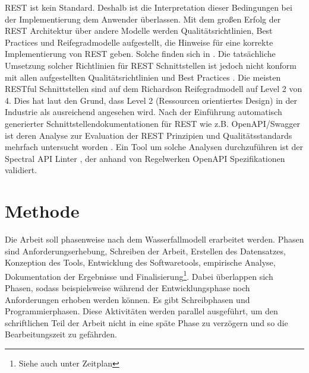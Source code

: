 REST ist kein Standard. Deshalb ist die Interpretation dieser Bedingungen bei der Implementierung dem Anwender überlassen. Mit dem großen Erfolg der REST Architektur über andere Modelle werden  Qualitätsrichtlinien, Best Practices und Reifegradmodelle aufgestellt, die Hinweise für eine korrekte Implementierung von REST geben. Solche finden sich in \parencite{pautasso_restful_2014}\parencite{petrillo_are_2016}\parencite{palma_detection_2014}\parencite{palma_semantic_2017}\parencite{richardson_restful_2007}\parencite{masse_rest_2011}\parencite{webber_rest_2010}\parencite{renzel_todays_2012}\parencite{rodriguez_rest_2016}\parencite{kotstein_which_2021}. 
Die tatsächliche Umsetzung solcher Richtlinien für REST Schnittstellen ist jedoch nicht konform mit allen aufgestellten Qualitätsrichtlinien und Best Practices 
\parencite{renzel_todays_2012}\parencite{palma_detection_2014}\parencite{rodriguez_rest_2016}\parencite{petrillo_are_2016}\parencite{palma_semantic_2017}\parencite{neumann_analysis_2021}. 
Die meisten RESTful Schnittstellen sind auf dem Richardson Reifegradmodell auf Level 2 von 4. Dies hat laut \parencite{kotstein_which_2021} den Grund, dass Level 2 (Ressourcen orientiertes Design) in der Industrie als ausreichend angesehen wird. Nach der Einführung automatisch  generierter Schnittstellendokumentationen für REST wie z.B. OpenAPI/Swagger ist deren Analyse zur Evaluation der REST Prinzipien und Qualitätsstandards mehrfach untersucht worden 
\parencite{haupt_framework_2017}\parencite{bogner_collecting_2020}\parencite{eriksson_using_2023}. 
Ein Tool um solche Analysen durchzuführen ist der Spectral API Linter \parencite{eriksson_using_2023}, der anhand von Regelwerken OpenAPI Spezifikationen validiert.


\section{Methode}
Die Arbeit soll phasenweise nach dem Wasserfallmodell erarbeitet werden. Phasen sind Anforderungserhebung, Schreiben der Arbeit, Erstellen des Datensatzes, Konzeption des Tools, Entwicklung des Softwaretools, empirische Analyse, Dokumentation der Ergebnisse und Finalisierung\footnote{Siehe auch unter Zeitplan}. Dabei überlappen sich Phasen, sodass beispielsweise während der Entwicklungsphase noch Anforderungen erhoben werden können. Es gibt Schreibphasen und Programmierphasen. Diese Aktivitäten werden parallel ausgeführt, um den schriftlichen Teil der Arbeit nicht in eine späte Phase zu verzögern und so die Bearbeitungszeit zu gefährden.

